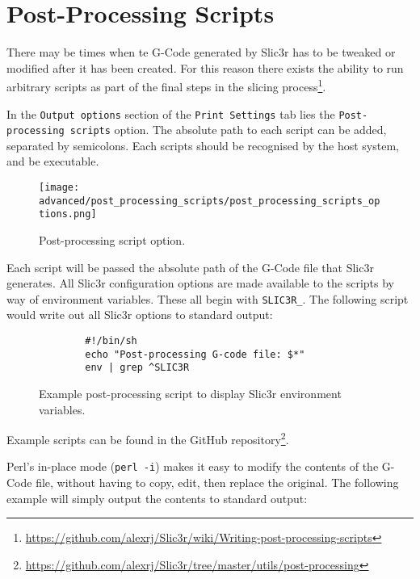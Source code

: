 
\section{Post-Processing Scripts} %
\label{sec:post_processing_scripts}

There may be times when te G-Code generated by Slic3r has to be tweaked or modified after it has been created.  For this reason there exists the ability to run arbitrary scripts as part of the final steps in the slicing process\footnote{\url{https://github.com/alexrj/Slic3r/wiki/Writing-post-processing-scripts}}.

In the \texttt{Output options} section of the \texttt{Print Settings} tab lies the \texttt{Post-processing scripts} option.  The absolute path to each script can be added, separated by semicolons. Each scripts should be recognised by the host system, and be executable.

\begin{figure}[H]
\centering
\texttt{[image: advanced/post\_processing\_scripts/post\_processing\_scripts\_options.png]}
\caption{Post-processing script option.}
\label{fig:post_processing_scripts_options}
\end{figure}

Each script will be passed the absolute path of the G-Code file that Slic3r generates.  All Slic3r configuration options are made available to the scripts by way of environment variables.  These all begin with \texttt{SLIC3R\_}.  The following script would write out all Slic3r options to standard output:

\begin{figure}[H]
\small
\begin{verbatim}
        #!/bin/sh
        echo "Post-processing G-code file: $*"
        env | grep ^SLIC3R
\end{verbatim}
\caption{Example post-processing script to display Slic3r environment variables.}
\label{fig:exaple_post_processing_script_env_vars}
\end{figure}

Example scripts can be found in the GitHub repository\footnote{\url{https://github.com/alexrj/Slic3r/tree/master/utils/post-processing}}.


Perl's in-place mode (\texttt{perl -i}) makes it easy to modify the contents of the G-Code file, without having to copy, edit, then replace the original.  The following example will simply output the contents to standard output:


